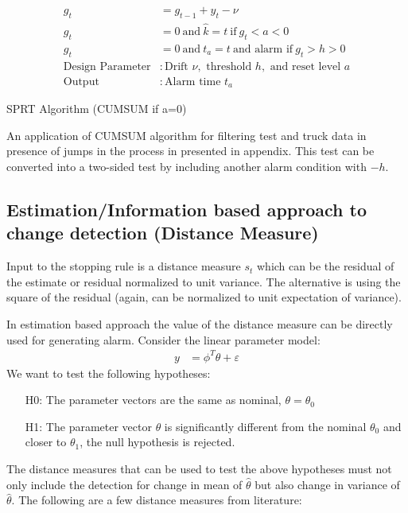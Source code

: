 \begin{algorithm}[H]
        \begin{align*}
                g_t &= g_{t-1} + y_t - \nu\\
                g_t &= 0 \: \text{and} \: \hat k = t \: \text{if} \: g_t < a < 0\\
                g_t &= 0 \: \text{and} \: t_a = t \: \text{and alarm if} \: g_t > h > 0\\
                \text{Design Parameter}&: \text{Drift } \nu, \text{ threshold } h, \text{ and reset level } a\\
                \text{Output}&: \text{Alarm time } t_a
        \end{align*}
        \caption{SPRT Algorithm (CUMSUM if a=0)}
\end{algorithm}

An application of CUMSUM algorithm for filtering test and truck data in presence of jumps in the process in presented in appendix. This test can be converted into a two-sided test by including another alarm condition with $-h$.


\subsection{Estimation/Information based approach to change detection (Distance Measure)}
Input to the stopping rule is a distance measure $s_t$ which can be the residual of the estimate or residual normalized to unit variance. The alternative is using the square of the residual (again, can be normalized to unit expectation of variance).

In estimation based approach the value of the distance measure can be directly used for generating alarm. Consider the linear parameter model:
\begin{align}
        y &= \phi^T \theta + \varepsilon
\end{align}
We want to test the following hypotheses:
\begin{itemize}
        \item[H0:] The parameter vectors are the same as nominal, $\theta = \theta_0$
        \item[H1:] The parameter vector $\theta$ is significantly different from the nominal $\theta_0$ and closer to $\theta_1$, the null hypothesis is rejected.
\end{itemize}
The distance measures that can be used to test the above hypotheses must not only include the detection for change in mean of $\hat \theta$ but also change in variance of $\hat \theta$. The following are a few distance measures from literature:

